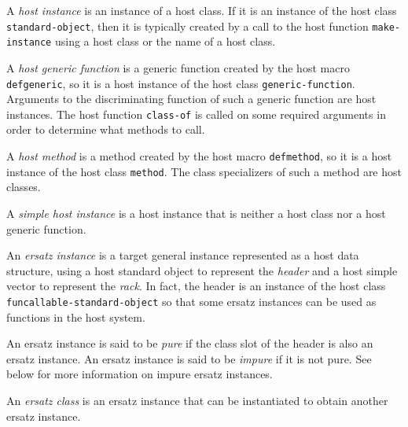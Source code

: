 \begin{definition}
A \emph{host instance} is an instance of a host class.  If it is an
instance of the host class \texttt{standard-object}, then it is
typically created by a call to the host function
\texttt{make-instance} using a host class or the name of a host class.
\end{definition}

\begin{definition}
A \emph{host generic function} is a generic function created by the
host macro \texttt{defgeneric}, so it is a host instance of the host
class \texttt{generic-function}.  Arguments to the discriminating
function of such a generic function are host instances.  The host
function \texttt{class-of} is called on some required arguments in
order to determine what methods to call.
\end{definition}

\begin{definition}
A \emph{host method} is a method created by the host macro
\texttt{defmethod}, so it is a host instance of the host class
\texttt{method}.  The class specializers of such a method are host
classes.
\end{definition}

\begin{definition}
A \emph{simple host instance} is a host instance that is neither a
host class nor a host generic function.
\end{definition}

\begin{definition}
An \emph{ersatz instance} is a target general instance represented as
a host data structure, using a host standard object to represent the
\emph{header} and a host simple vector to represent the \emph{rack}.
In fact, the header is an instance of the host class
\texttt{funcallable-standard-object} so that some ersatz instances can
be used as functions in the host system.
\end{definition}

\begin{definition}
An ersatz instance is said to be \emph{pure} if the class slot of the
header is also an ersatz instance.  An ersatz instance is said to be
\emph{impure} if it is not pure.  See below for more information on
impure ersatz instances.
\end{definition}

\begin{definition}
An \emph{ersatz class} is an ersatz instance that can be instantiated
to obtain another ersatz instance.
\end{definition}

